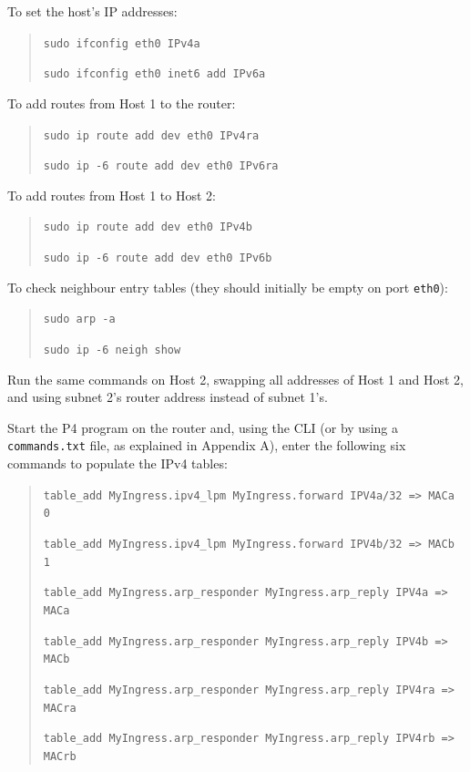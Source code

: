 To set the host’s IP addresses:
\begin{quote}
    \texttt{sudo ifconfig eth0 IPv4a}
    
    \texttt{sudo ifconfig eth0 inet6 add IPv6a}
\end{quote}

To add routes from Host 1 to the router:
\begin{quote}
    \texttt{sudo ip route add dev eth0 IPv4ra}
    
    \texttt{sudo ip -6 route add dev eth0 IPv6ra}
\end{quote}

To add routes from Host 1 to Host 2:
\begin{quote}
    \texttt{sudo ip route add dev eth0 IPv4b}
    
    \texttt{sudo ip -6 route add dev eth0 IPv6b}
\end{quote}

To check neighbour entry tables (they should initially be empty on port \texttt{eth0}):
\begin{quote}
    \texttt{sudo arp -a}
    
    \texttt{sudo ip -6 neigh show}
\end{quote}

Run the same commands on Host 2, swapping all addresses of Host 1 and Host 2, and using subnet 2’s router address instead of subnet 1’s.

Start the P4 program on the router and, using the CLI (or by using a \texttt{commands.txt} file, as explained in Appendix A), enter the following six commands to populate the IPv4 tables:
\begin{quote}
    \texttt{table\_add MyIngress.ipv4\_lpm MyIngress.forward IPV4a/32 => MACa 0}

    \texttt{table\_add MyIngress.ipv4\_lpm MyIngress.forward IPV4b/32 => MACb 1}
    
    \texttt{table\_add MyIngress.arp\_responder MyIngress.arp\_reply IPV4a => MACa}
    
    \texttt{table\_add MyIngress.arp\_responder MyIngress.arp\_reply IPV4b => MACb}

    \texttt{table\_add MyIngress.arp\_responder MyIngress.arp\_reply IPV4ra => MACra}

    \texttt{table\_add MyIngress.arp\_responder MyIngress.arp\_reply IPV4rb => MACrb}
\end{quote}

